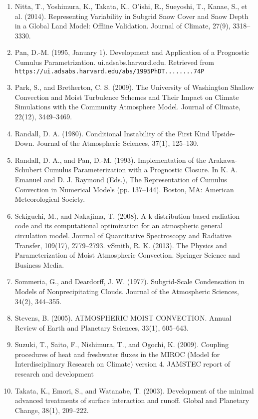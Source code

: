 \begin{enumerate}
\item Nitta, T., Yoshimura, K., Takata, K., O’ishi, R., Sueyoshi, T., Kanae, S., et al. (2014). Representing Variability in Subgrid Snow Cover and Snow Depth in a Global Land Model: Offline Validation. Journal of Climate, 27(9), 3318–3330.
\item Pan, D.-M. (1995, January 1). Development and Application of a Prognostic Cumulus Parametrization. ui.adsabs.harvard.edu. Retrieved from \\
\texttt{https://ui.adsabs.harvard.edu/abs/1995PhDT........74P}
\item Park, S., and Bretherton, C. S. (2009). The University of Washington Shallow Convection and Moist Turbulence Schemes and Their Impact on Climate Simulations with the Community Atmosphere Model. Journal of Climate, 22(12), 3449–3469.
\item Randall, D. A. (1980). Conditional Instability of the First Kind Upside-Down. Journal of the Atmospheric Sciences, 37(1), 125–130.
\item Randall, D. A., and Pan, D.-M. (1993). Implementation of the Arakawa-Schubert Cumulus Parameterization with a Prognostic Closure. In K. A. Emanuel and D. J. Raymond (Eds.), The Representation of Cumulus Convection in Numerical Models (pp. 137–144). Boston, MA: American Meteorological Society.
\item Sekiguchi, M., and Nakajima, T. (2008). A k-distribution-based radiation code and its computational optimization for an atmospheric general circulation model. Journal of Quantitative Spectroscopy and Radiative Transfer, 109(17), 2779–2793.
vSmith, R. K. (2013). The Physics and Parameterization of Moist Atmospheric Convection. Springer Science and Business Media.
\item Sommeria, G., and Deardorff, J. W. (1977). Subgrid-Scale Condensation in Models of Nonprecipitating Clouds. Journal of the Atmospheric Sciences, 34(2), 344–355.
\item Stevens, B. (2005). ATMOSPHERIC MOIST CONVECTION. Annual Review of Earth and Planetary Sciences, 33(1), 605–643.
\item Suzuki, T., Saito, F., Nishimura, T., and Ogochi, K. (2009). Coupling procedures of heat and freshwater fluxes in the MIROC (Model for Interdisciplinary Research on Climate) version 4. JAMSTEC report of research and development
\item Takata, K., Emori, S., and Watanabe, T. (2003). Development of the minimal advanced treatments of surface interaction and runoff. Global and Planetary Change, 38(1), 209–222.

\end{enumerate}
